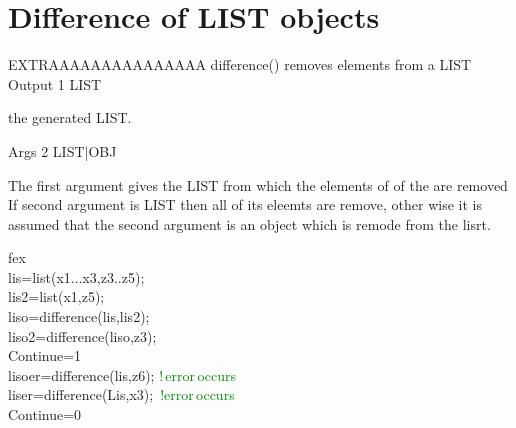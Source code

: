 \section*{Difference of LIST objects}
EXTRAAAAAAAAAAAAAAA
\textcolor{VioletRed}{difference}() removes elements from a LIST
\vspace{0.3cm}
\hline
\vspace{0.3cm}
\noindent Output \tabto{3cm}  1 \tabto{5cm}  LIST  \tabto{7cm}
\begin{changemargin}{3cm}{0cm}
\noindent  the generated LIST.
\end{changemargin}
\vspace{0.3cm}
\hline
\vspace{0.3cm}
\noindent Args \tabto{3cm} 2 \tabto{5cm}  LIST|OBJ  \tabto{7cm}
\begin{changemargin}{3cm}{0cm}
\noindent  The first argument gives the LIST from which the elements of of the
are removed  If second argument is LIST then all of its eleemts are remove, other wise
it is assumed that the second argument is an object which is remode from the lisrt.
\end {changemargin}
\hline
\vspace{0.2cm}
\begin{example}[diffex]fex\\
\label{diffex}
lis=\textcolor{VioletRed}{list}(x1...x3,z3..z5);\\
lis2=\textcolor{VioletRed}{list}(x1,z5);\\
liso=\textcolor{VioletRed}{difference}(lis,lis2);\\
liso2=\textcolor{VioletRed}{difference}(liso,z3);\\
Continue=1\\
lisoer=\textcolor{VioletRed}{difference}(lis,z6); \textcolor{green}{!\,error\,occurs}\\
liser=\textcolor{VioletRed}{difference}(Lis,x3); \,\textcolor{green}{!error\,occurs}\\
Continue=0
\end{example}
